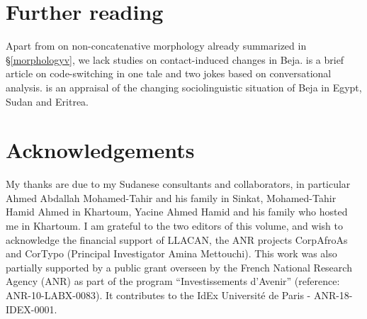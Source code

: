 \documentclass[output=paper]{langsci/langscibook}
\begin{document}
\section*{Further reading}

Apart from \citet{Vanhove2012} on non-concatenative morphology already summarized in §\ref{morphologyv}, we lack studies on contact-induced changes in Beja. \citet{Vanhove2003} is a brief article on code-switching in one tale and two jokes based on conversational analysis. \citet{Wedekind2012} is an appraisal of the changing sociolinguistic situation of Beja in Egypt, Sudan and Eritrea.

\section*{Acknowledgements}

My thanks are due to my Sudanese consultants and collaborators, in particular Ahmed Abdallah Mohamed-Tahir and his family in Sinkat, Mohamed-Tahir Hamid Ahmed in Khartoum, Yacine Ahmed Hamid and his family who hosted me in Khartoum. I am grateful to the two editors of this volume, and wish to acknowledge the financial support of LLACAN, the ANR projects CorpAfroAs and CorTypo (Principal Investigator Amina Mettouchi). This work was also partially supported by a public grant overseen by the French National Research Agency (ANR) as part of the program “Investissements d'Avenir” (reference: ANR-10-LABX-0083). It contributes to the IdEx Université de Paris - ANR-18-IDEX-0001.
\end{document}
